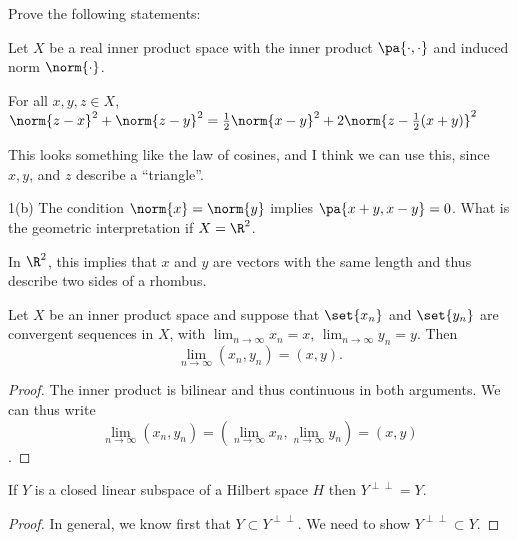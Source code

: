 \documentclass[10pt,letterpaper,twoside]{hmcpset}
\begin{document}
Prove the following statements:

\begin{problem}[1]
 Let $X$ be a real inner product space with the inner product $\pa{\cdot,\cdot}$ and induced norm $\norm{\cdot}$.
 \end{problem}

\begin{problem}[1(a)]
 For all $x,y,z \in X$, $\norm{z-x}^2 + \norm{z-y}^2 = \frac{1}{2}\norm{x-y}^2 + 2\norm{z - \frac{1}{2}(x+y)}^2$
\end{problem}

\begin{solution}
 This looks something like the law of cosines, and I think we can use this, since $x,y$, and $z$ describe a ``triangle''.
\end{solution}


\begin{problem}{1(b)}
   The condition $\norm{x} = \norm{y}$ implies $\pa{x+y,x-y} = 0$.  What is the geometric interpretation if $X = \R^2$.
\end{problem}

\begin{solution}
 In $\R^2$, this implies that $x$ and $y$ are vectors with the same length and thus describe two sides of a rhombus.
\end{solution}


\begin{problem}[2]
 Let $X$ be an inner product space and suppose that $\set{x_n}$ and $\set{y_n}$ are convergent sequences in $X$, with $\lim_{n\to\infty} x_n = x$, $\lim_{n\to\infty} y_n = y$.  Then \[\lim_{n\to\infty}(x_n,y_n) = (x,y).\]
\end{problem}

\begin{solution}
 \begin{proof}
  The inner product is bilinear and thus continuous in both arguments.  We can thus write \[\lim_{n\to\infty}(x_n,y_n) = (\lim_{n\to\infty} x_n, \lim_{n\to\infty} y_n) = (x,y)\].
 \end{proof}
\end{solution}

\begin{problem}[3]
 If $Y$ is a closed linear subspace of a Hilbert space $H$ then $Y^{\perp\perp} = Y$.
\end{problem}

\begin{solution}
 \begin{proof}
  In general, we know first that $Y \subset Y^{\perp\perp}$. We need to show $Y^{\perp\perp} \subset Y$.
 \end{proof}
\end{solution}
\end{document}

